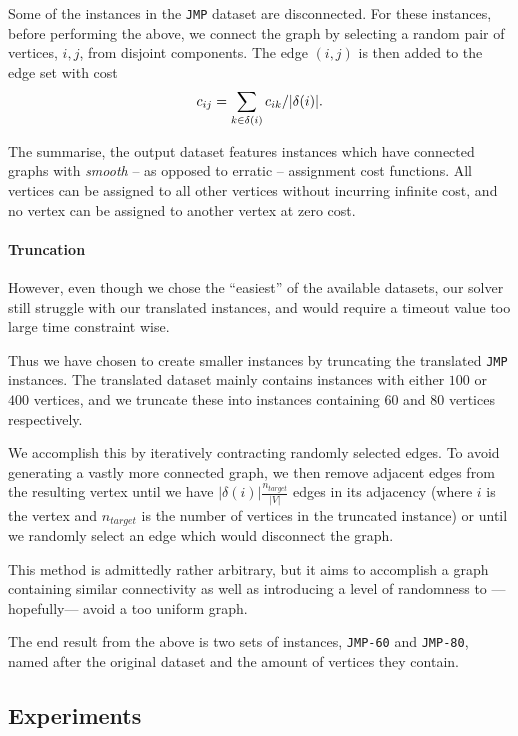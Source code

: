  Some of the instances in the \texttt{JMP} dataset are disconnected. For these instances,
 before performing the above, we connect the graph by selecting a random pair of vertices,
 $i,j$, from disjoint components. The edge $(i,j)$ is then added to the edge set with cost
 $$c_{ij} = \sum_{k \in \delta(i)} c_{ik} / |\delta(i)|\mathnormal{.}$$

 The summarise, the output dataset features instances which have connected graphs with
 \textit{smooth} -- as opposed to erratic -- assignment cost functions. All vertices
 can be assigned to all other vertices without incurring infinite cost, and no vertex
 can be assigned to another vertex at zero cost. 

 \paragraph{Truncation} However, even though we chose the ``easiest'' of the available datasets,
 our solver still struggle with our translated instances, and would require a timeout
 value too large time constraint wise.

 Thus we have chosen to create smaller instances by truncating the translated \texttt{JMP}
 instances. The translated dataset mainly contains instances with either $100$ or $400$ vertices,
 and we truncate these into instances containing $60$ and $80$ vertices respectively.

 We accomplish this by iteratively contracting randomly selected edges. To avoid generating a
 vastly more connected graph, we then remove adjacent edges from the resulting vertex until
 we have $|\delta(i)| \frac{n_{target}}{|V|}$ edges in its adjacency (where $i$ is the vertex
 and $n_{target}$ is the number of vertices in the truncated instance) or until we randomly select
 an edge which would disconnect the graph.

 This method is admittedly rather arbitrary, but it aims to accomplish a graph containing similar
 connectivity as well as introducing a level of randomness to ---hopefully--- avoid a too uniform graph.

 The end result from the above is two sets of instances, \texttt{JMP-60} and \texttt{JMP-80}, named
 after the original dataset and the amount of vertices they contain.
 
 \subsection{Experiments}

